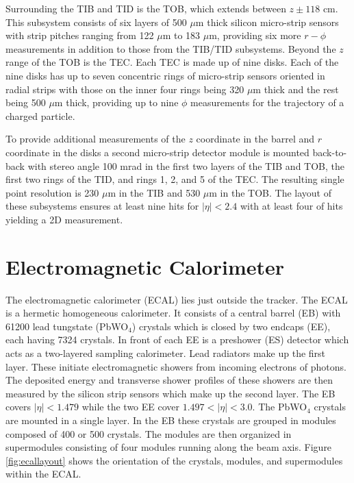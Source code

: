 Surrounding the TIB and TID is the TOB, which extends between $z \pm 118$ cm.  This subsystem consists of six layers of 500 $\mu$m thick silicon micro-strip sensors with strip pitches ranging from 122 $\mu$m to 183 $\mu$m, providing six more $r-\phi$ measurements in addition to those from the TIB/TID subsystems. Beyond the $z$ range of the TOB is the TEC.  Each TEC is made up of nine disks.  Each of the nine disks has up to seven concentric rings of micro-strip sensors oriented in radial strips with those on the inner four rings being 320 $\mu$m thick and the rest being 500 $\mu$m thick, providing up to nine $\phi$ measurements for the trajectory of a charged particle.  

To provide additional measurements of the $z$ coordinate in the barrel and $r$ coordinate in the disks a second micro-strip detector module is mounted back-to-back with stereo angle 100 mrad in the first two layers of the TIB and TOB, the first two rings of the TID, and rings 1, 2, and 5 of the TEC.  The resulting single point resolution is 230 $\mu$m in the TIB and 530 $\mu$m in the TOB.  The layout of these subsystems ensures at least nine hits for $|\eta| < 2.4$ with at least four of hits yielding a 2D measurement.



\section{Electromagnetic Calorimeter}
The electromagnetic calorimeter (ECAL) lies just outside the tracker.  The ECAL is a hermetic homogeneous calorimeter.  It consists of a central barrel (EB) with 61200 lead tungstate (PbWO$_{4}$) crystals which is closed by two endcaps (EE), each having 7324 crystals.  In front of each EE is a preshower (ES) detector which acts as a two-layered sampling calorimeter.  Lead radiators make up the first layer.  These initiate electromagnetic showers from incoming electrons of photons.  The deposited energy and transverse shower profiles of these showers are then measured by the silicon strip sensors which make up the second layer.  The EB covers $|\eta|<1.479$ while the two EE cover $1.497<|\eta|<3.0$.  The PbWO$_{4}$ crystals are mounted in a single layer.  In the EB these crystals are grouped in modules composed of 400 or 500 crystals.  The modules are then organized in supermodules consisting of four modules running along the beam axis.  Figure \ref{fig:ecallayout} shows the orientation of the crystals, modules, and supermodules within the ECAL.
 
